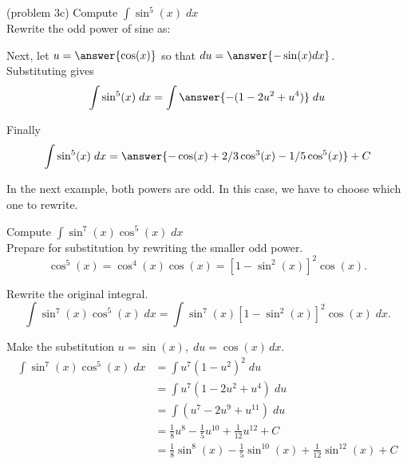 \documentclass[handout]{ximera}
\begin{document}
\begin{problem}{\color{gray}(problem 3c)} 
Compute $\displaystyle{\int \sin^5(x) \; dx}$\\

Rewrite the odd power of sine as:

\begin{multipleChoice}
\end{multipleChoice}

Next, let $u = \answer{\cos(x)}$ so that $du = \answer{-\sin(x) dx}$.\\

Substituting gives
\[
\int \sin^5(x) \; dx= \int \answer{-(1-2u^2 + u^4)} \; du
\]

Finally
\[
\int \sin^5(x) \; dx= \answer{- \cos(x) + 2/3 \cos^3(x) - 1/5 \cos^5(x)} + C
\]

\end{problem}

In the next example, both powers are odd.  In this case, we have to choose which one to rewrite.



\begin{example}[example 4]
Compute $\displaystyle{\int \sin^7(x)\cos^5(x) \; dx}$\\

Prepare for substitution by rewriting the smaller odd power.
\[
\cos^5(x) = \cos^4(x) \cos(x) = \left[1-\sin^2(x)\right]^2 \cos(x).
\]

Rewrite the original integral.
\[
\int \sin^7(x)\cos^5(x) \; dx = \int \sin^7(x)\left[1 - \sin^2(x)\right]^2 \cos(x) \; dx.
\]

Make the substitution $u = \sin(x), \; du = \cos(x) \, dx$.
\begin{align*}
\int \sin^7(x)\cos^5(x) \; dx  &= \int u^7 (1-u^2)^2 \; du\\
   &= \int u^7(1 - 2u^2 + u^4) \; du\\
   &= \int (u^7 - 2u^9 + u^{11}) \; du\\
  &= \tfrac18 u^8 - \tfrac15 u^{10} + \tfrac{1}{12}u^{12}+ C \\
  &= \tfrac18 \sin^8(x) - \tfrac15 \sin^{10}(x) + \tfrac{1}{12} \sin^{12}(x)+ C
\end{align*}

\end{example}
\end{document}
